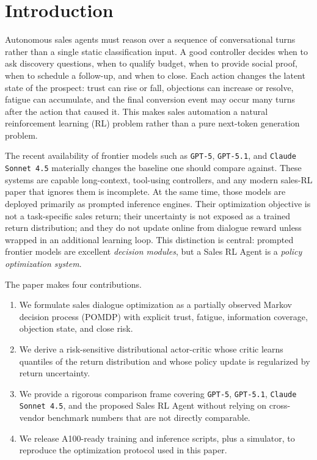 \documentclass[conference]{IEEEtran}
\begin{document}
\section{Introduction}
Autonomous sales agents must reason over a sequence of conversational turns rather than a single static classification input. A good controller decides when to ask discovery questions, when to qualify budget, when to provide social proof, when to schedule a follow-up, and when to close. Each action changes the latent state of the prospect: trust can rise or fall, objections can increase or resolve, fatigue can accumulate, and the final conversion event may occur many turns after the action that caused it. This makes sales automation a natural reinforcement learning (RL) problem rather than a pure next-token generation problem.

The recent availability of frontier models such as \texttt{GPT-5}, \texttt{GPT-5.1}, and \texttt{Claude Sonnet 4.5} materially changes the baseline one should compare against. These systems are capable long-context, tool-using controllers, and any modern sales-RL paper that ignores them is incomplete. At the same time, those models are deployed primarily as prompted inference engines. Their optimization objective is not a task-specific sales return; their uncertainty is not exposed as a trained return distribution; and they do not update online from dialogue reward unless wrapped in an additional learning loop. This distinction is central: prompted frontier models are excellent \emph{decision modules}, but a Sales RL Agent is a \emph{policy optimization system}.

The paper makes four contributions.
\begin{enumerate}
\item We formulate sales dialogue optimization as a partially observed Markov decision process (POMDP) with explicit trust, fatigue, information coverage, objection state, and close risk.
\item We derive a risk-sensitive distributional actor-critic whose critic learns quantiles of the return distribution and whose policy update is regularized by return uncertainty.
\item We provide a rigorous comparison frame covering \texttt{GPT-5}, \texttt{GPT-5.1}, \texttt{Claude Sonnet 4.5}, and the proposed Sales RL Agent without relying on cross-vendor benchmark numbers that are not directly comparable.
\item We release A100-ready training and inference scripts, plus a simulator, to reproduce the optimization protocol used in this paper.
\end{enumerate}
\end{document}

